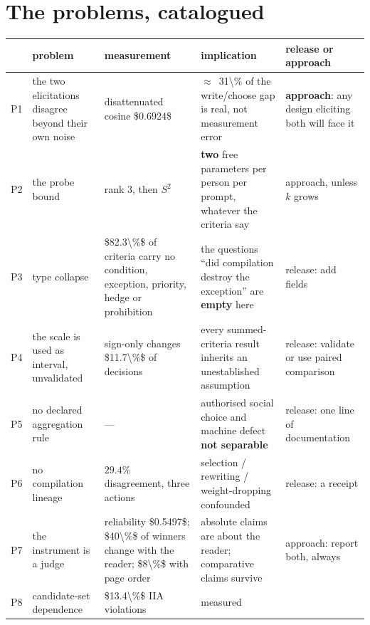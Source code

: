\section{The problems, catalogued}
\label{sec:problems}


\begin{table}[H]\centering\footnotesize
\begin{tabularx}{\textwidth}{P{0.7cm}P{3.4cm}P{3.0cm}P{4.0cm}Y}
\toprule
& problem & measurement & implication & release or approach\\
\midrule
P1 & the two elicitations disagree beyond their own noise & disattenuated cosine
\num{$0.6924$} & $\approx$~\num{31\%} of the write/choose gap is real, not
measurement error & \textbf{approach}: any design eliciting both will face it\\
P2 & the probe bound & rank $3$, then $S^2$ & \textbf{two} free parameters per
person per prompt, whatever the criteria say & approach, unless $k$ grows\\
P3 & type collapse & \num{$82.3\%$} of criteria carry no condition, exception,
priority, hedge or prohibition & the questions ``did compilation destroy the
exception'' are \textbf{empty} here & release: add fields\\
P4 & the scale is used as interval, unvalidated & sign-only changes
\num{$11.7\%$} of decisions & every summed-criteria result inherits an
unestablished assumption & release: validate or use paired comparison\\
P5 & no declared aggregation rule & --- & authorised social choice and machine
defect \textbf{not separable} & release: one line of documentation\\
P6 & no compilation lineage & $29.4\%$ disagreement, three actions & selection /
rewriting / weight-dropping confounded & release: a receipt\\
P7 & the instrument is a judge & reliability \num{$0.5497$}; \num{$40\%$} of
winners change with the reader; \num{$8\%$} with page order & absolute claims are
about the reader; comparative claims survive & approach: report both, always\\
P8 & candidate-set dependence & \num{$13.4\%$} IIA violations & measured

\end{tabularx}
\end{table}
